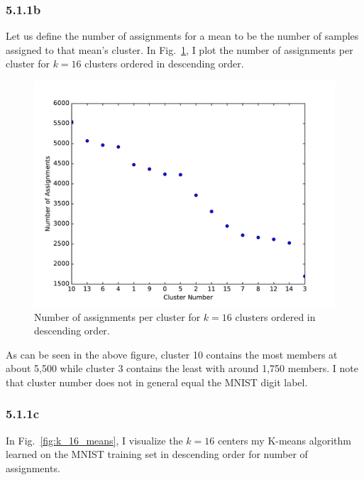 \documentclass[12pt]{amsart}
\begin{document}
\subsubsection*{5.1.1b}

Let us define the number of assignments for a mean to be the number of samples assigned to that mean's cluster.  In Fig.~\ref{fig:k_16_num_assignments}, I plot the number of assignments per cluster for $k = 16$ clusters ordered in descending order.

\begin{figure}[H]
	\includegraphics[width=\columnwidth]{k_16_num_assignments.pdf}
    \caption{Number of assignments per cluster for $k = 16$ clusters ordered in descending order.}
    \label{fig:k_16_num_assignments}
\end{figure}

As can be seen in the above figure, cluster 10 contains the most members at about 5,500 while cluster 3 contains the least with around 1,750 members.  I note that cluster number does not in general equal the MNIST digit label.

\subsubsection*{5.1.1c}

In Fig.~\ref{fig:k_16_means}, I visualize the $k = 16$ centers my K-means algorithm learned on the MNIST training set in descending order for number of assignments.
\end{document}
